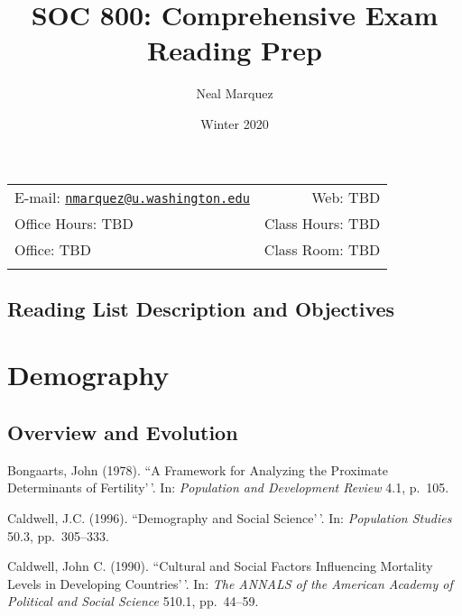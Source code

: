 \documentclass[11pt,]{article}
\title{SOC 800: Comprehensive Exam Reading Prep}
\author{Neal Marquez}
\date{Winter 2020}
\begin{document}
  

		\maketitle
		
	
		\thispagestyle{firststyle}



	\noindent \begin{tabular*}{\textwidth}{ @{\extracolsep{\fill}} lr @{\extracolsep{\fill}}}


E-mail: \texttt{\href{mailto:nmarquez@u.washington.edu}{\nolinkurl{nmarquez@u.washington.edu}}} & Web: TBD\\
Office Hours: TBD  &  Class Hours: TBD\\
Office: TBD  & Class Room: TBD\\
	&  \\
	\hline
	\end{tabular*}
	
\vspace{2mm}
	


\hypertarget{reading-list-description-and-objectives}{%
\subsection{Reading List Description and
Objectives}\label{reading-list-description-and-objectives}}

\hypertarget{demography}{%
\section{Demography}\label{demography}}

\hypertarget{overview-and-evolution}{%
\subsection{Overview and Evolution}\label{overview-and-evolution}}

Bongaarts, John (1978). ``A Framework for Analyzing the Proximate
Determinants of Fertility'\,'. In:
\emph{Population and Development Review} 4.1, p.~105.

Caldwell, J.C. (1996). ``Demography and Social Science'\,'. In:
\emph{Population Studies} 50.3, pp.~305--333.

Caldwell, John C. (1990). ``Cultural and Social Factors Influencing
Mortality Levels in Developing Countries'\,'. In:
\emph{The ANNALS of the American Academy of Political and Social Science}
510.1, pp.~44--59.
\end{document}
